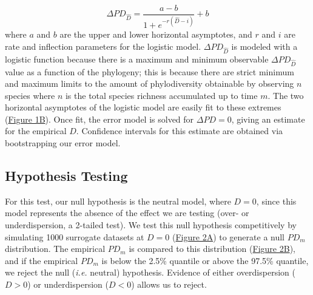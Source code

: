 \documentclass{article}
\begin{document}
\begin{equation}
	\label{sec:equation2}
	\Delta PD_{\hat{D}} = \frac {a-b} { 1 + e^{-r(\hat{D} -i)} } + b 
\end{equation}
where \(a\) and \(b\) are the upper and lower horizontal asymptotes, and \(r\) and \(i\) are rate and inflection parameters for the logistic model. \(\Delta PD_{\hat{D}}\) is modeled with a logistic function because there is a maximum and minimum observable \(\Delta PD_{\hat{D}}\) value as a function of the phylogeny; this is because there are strict minimum and maximum limits to the amount of phylodiversity obtainable by observing \(n\) species where \(n\) is the total species richness accumulated up to time \(m\). The two horizontal asymptotes of the logistic model are easily fit to these extremes (\hyperref[sec:figure1]{Figure 1B}). Once fit, the error model is solved for \(\Delta PD=0\), giving an estimate for the empirical \(D\). Confidence intervals for this estimate are obtained via bootstrapping our error model.

\subsection{Hypothesis Testing} \label{sec:hypothesisTesting}
For this test, our null hypothesis is the neutral model, where \(D = 0\), since this model represents the absence of the effect we are testing (over- or underdispersion, a 2-tailed test). We test this null hypothesis competitively by simulating 1000 surrogate datasets at \(D = 0\) (\hyperref[sec:figure2]{Figure 2A}) to generate a null \(PD_m\) distribution. The empirical \(PD_m\) is compared to this distribution (\hyperref[sec:figure2]{Figure 2B}), and if the empirical \(PD_m\) is below the 2.5\% quantile or above the 97.5\% quantile, we reject the null (\emph{i.e.} neutral) hypothesis. Evidence of either overdispersion (\(D > 0\)) or underdispersion (\(D < 0\)) allows us to reject.
\end{document}
